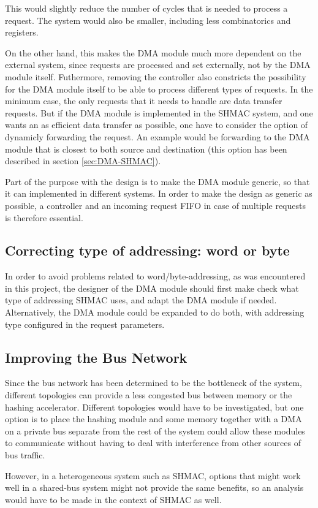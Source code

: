 This would slightly reduce the number of cycles that is needed to process a request.
The system would also be smaller, including less combinatorics and registers.

On the other hand, this makes the DMA module much more dependent on the external system, since requests are processed and set externally, not by the DMA module itself.
Futhermore, removing the controller also constricts the possibility for the DMA module itself to be able to process different types of requests.
In the minimum case, the only requests that it needs to handle are data transfer requests.
But if the DMA module is implemented in the SHMAC system, and one wants an as efficient data transfer as possible, one have to consider the option of dynamicly forwarding the request.
An example would be forwarding to the DMA module that is closest to both source and destination (this option has been described in section \ref{sec:DMA-SHMAC}).

Part of the purpose with the design is to make the DMA module generic, so that it can implemented in different systems.
In order to make the design as generic as possible, a controller and an incoming request FIFO
in case of multiple requests is therefore essential.

\subsection{Correcting type of addressing: word or byte}
In order to avoid problems related to word/byte-addressing, as was encountered in this project, the designer of the DMA module should first make check what type of addressing SHMAC uses, and adapt the DMA module if needed. 
Alternatively, the DMA module could be expanded to do both, with addressing type configured in the request parameters.

\subsection{Improving the Bus Network}
Since the bus network has been determined to be the bottleneck of the system, different topologies
can provide a less congested bus between memory or the hashing accelerator. Different topologies
would have to be investigated, but one option is to place the hashing module and some memory together
with a DMA on a private bus separate from the rest of the system could allow these modules to
communicate without having to deal with interference from other sources of bus traffic.

However, in a heterogeneous system such as SHMAC, options that might work well in a shared-bus
system might not provide the same benefits, so an analysis would have to be made in the context
of SHMAC as well.

